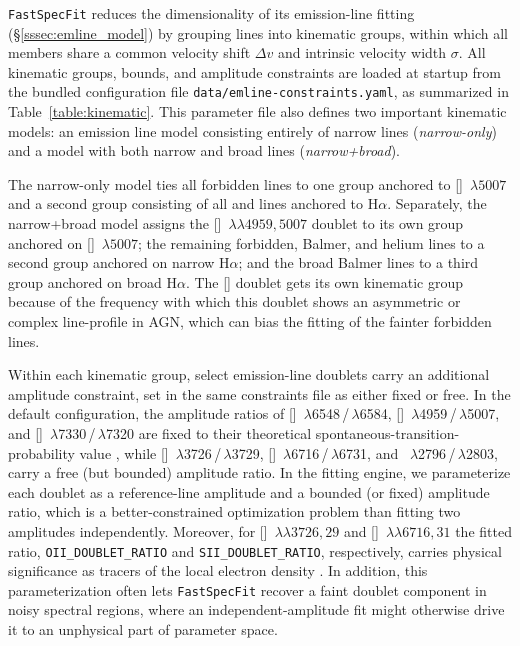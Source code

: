 \documentclass[modern,linenumbers]{aastex701}
\newcommand{\fastspecfit}{\texttt{FastSpecFit}}
\newcommand{\mgii}{\ion{Mg}{2}}
\newcommand{\oii}{[\ion{O}{2}]}
\newcommand{\oiii}{[\ion{O}{3}]}
\newcommand{\nii}{[\ion{N}{2}]}
\newcommand{\sii}{[\ion{S}{2}]}
\newcommand{\hei}{\ion{He}{1}}
\newcommand{\ha}{H\ensuremath{\alpha}}
\newcommand{\oiiilam}{[\ion{O}{3}]~$\lambda5007$}
\newcommand{\oiidoublet}{[\ion{O}{2}]~$\lambda\lambda3726,29$}
\newcommand{\oiiidoublet}{[\ion{O}{3}]~$\lambda\lambda4959,5007$}
\newcommand{\siidoublet}{[\ion{S}{2}]~$\lambda\lambda6716,31$}
\begin{document}
\fastspecfit{} reduces the dimensionality of its emission-line fitting
(\S\ref{sssec:emline_model}) by grouping lines into kinematic groups,
within which all members share a common velocity shift $\Delta v$ and
intrinsic velocity width $\sigma$. All kinematic groups, bounds, and
amplitude constraints are loaded at startup from the bundled
configuration file \texttt{data/emline-constraints.yaml}, as
summarized in Table~\ref{table:kinematic}. This parameter file also
defines two important kinematic models: an emission line model
consisting entirely of narrow lines (\emph{narrow-only}) and a model
with both narrow and broad lines (\emph{narrow+broad}).




The narrow-only model ties all forbidden lines to one group anchored
to \oiiilam{} and a second group consisting of all  and
\hei{} lines anchored to \ha. Separately, the narrow+broad model
assigns the \oiiidoublet{} doublet to its own group anchored on
\oiiilam; the remaining forbidden, Balmer, and helium lines to a
second group anchored on narrow \ha; and the broad Balmer lines to a
third group anchored on broad \ha. The \oiii{} doublet gets its own
kinematic group because of the frequency with which this doublet shows
an asymmetric or complex line-profile in AGN, which can bias the
fitting of the fainter forbidden lines.

Within each kinematic group, select emission-line doublets carry an
additional amplitude constraint, set in the same constraints file as
either fixed or free. In the default configuration, the amplitude
ratios of \nii~$\lambda$6548\,/\,$\lambda$6584,
\oiii~$\lambda$4959\,/\,$\lambda$5007, and
\oii~$\lambda$7330\,/\,$\lambda$7320 are fixed to their theoretical
spontaneous-transition-probability value \citep{osterbrock89a}, while
\oii~$\lambda$3726\,/\,$\lambda$3729,
\sii~$\lambda$6716\,/\,$\lambda$6731, and
\mgii~$\lambda$2796\,/\,$\lambda$2803, carry a free (but bounded)
amplitude ratio. In the fitting engine, we parameterize each doublet
as a reference-line amplitude and a bounded (or fixed) amplitude
ratio, which is a better-constrained optimization problem than fitting
two amplitudes independently. Moreover, for \oiidoublet{} and
\siidoublet{} the fitted ratio, \texttt{OII\_DOUBLET\_RATIO} and
\texttt{SII\_DOUBLET\_RATIO}, respectively, carries physical
significance as tracers of the local electron density
\citep{osterbrock89a}. In addition, this parameterization often lets
\fastspecfit{} recover a faint doublet component in noisy spectral
regions, where an independent-amplitude fit might otherwise drive it
to an unphysical part of parameter space.
\end{document}
